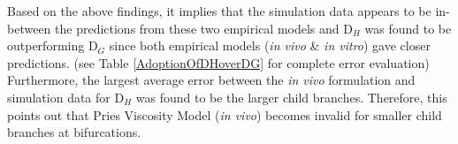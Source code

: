 \begin{table}[H]
\centering
\caption{\textit{Overall average errors of empirical prediction by Pries Viscosity Models (\textit{in vivo} \& \textit{in vitro}) in comparison to simulation data. The coloured numbers (red and green) indicate the relatively larger and smaller deviations respectively.}
\label{AdoptionOfDHoverDG}}
\end{table}

\noindent Based on the above findings, it implies that the simulation data appears to be in-between the predictions from these two empirical models and D$_{H}$ was found to be outperforming D$_{G}$ since both empirical models (\textit{in vivo} \& \textit{in vitro}) gave closer predictions. (see Table \ref{AdoptionOfDHoverDG} for complete error evaluation) Furthermore, the largest average error between the \textit{in vivo} formulation and simulation data for D$_{H}$ was found to be the larger child branches. Therefore, this points out that Pries Viscosity Model (\textit{in vivo}) becomes invalid for smaller child branches at bifurcations. 


